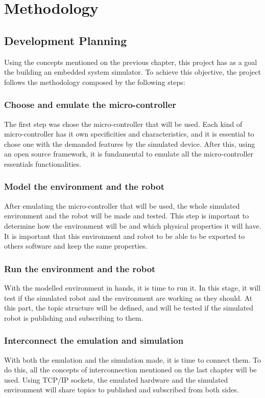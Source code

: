 \documentclass[../monografia.tex]{subfiles}
\begin{document}
\chapter{Methodology}
\label{chapter: Methodology}

\section{Development Planning}

Using the concepts mentioned on the previous chapter, this project has as a goal the building an embedded system simulator.
To achieve this objective, the project follows the methodology composed by the following steps:

\subsection{Choose and emulate the micro-controller}
The first step was chose the micro-controller that will be used. Each kind of micro-controller has it own specificities and characteristics, and it is essential to chose one with the demanded features by the simulated device. After this, using an open source framework, it is fundamental to emulate all the micro-controller essentials functionalities.

\subsection{Model the environment and the robot}
After emulating the micro-controller that will be used, the whole simulated environment and the robot will be made and tested. This step is important to determine how the environment will be and which physical properties it will have. It is important that this environment and robot to be able to be exported to others software and keep the same properties. 

\subsection{Run the environment and the robot}
With the modelled environment in hands, it is time to run it. In this stage, it will test if the simulated robot and the environment are working as they should. At this part, the topic structure will be defined, and will be tested if the simulated robot is publishing and subscribing to them.

\subsection{Interconnect the emulation and simulation}
With both the emulation and the simulation made, it is time to connect them. To do this, all the concepts of interconnection mentioned on the last chapter will be used. Using TCP/IP sockets, the emulated hardware and the simulated environment will share topics to published and subscribed from both sides. 
\end{document}
